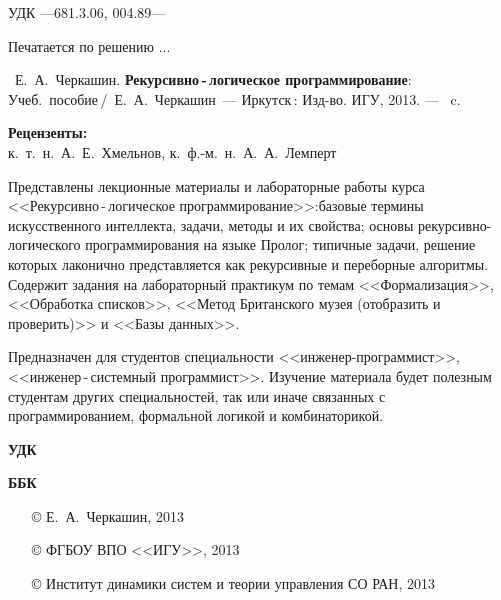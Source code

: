 \documentclass[12pt, openany, twoside]{book} %
\newenvironment{mygroup}{}{}
\begin{document}
\newpage
\begin{mygroup}
\thispagestyle{empty}
\noindent УДК ---681.3.06, 004.89---

\begin{raggedright}
\hspace{6em}Печатается по решению ...
\end{raggedright}

\vfill%
{}

{~Е.~А.~Черкашин.} {\bf Рекурсивно\,-\,логическое программирование}: Учеб.~пособие\,/~Е.~А.~Черкашин~---
Иркутск\,: Изд-во. ИГУ, 2013. --- \pageref{pg:lastpage}~c.
\vspace{1ex}
\begin{center}
\textbf{Рецензенты:} \\
к.~т.~н.~А.~Е.~Хмельнов, к.~ф.-м.~н.~А.~А.~Лемперт
\end{center}
\vspace{1ex}
Представлены лекционные материалы и лабораторные работы курса <<Рекурсивно\,-\,логическое программирование>>:базовые термины искусственного интеллекта, задачи, методы и их свойства; основы рекурсивно-логического программирования на языке Пролог; типичные задачи, решение которых лаконично представляется как рекурсивные и переборные алгоритмы. Содержит задания на лабораторный практикум по темам <<Формализация>>, <<Обработка списков>>, <<Метод Британского музея (отобразить и проверить)>> и <<Базы данных>>.

    Предназначен для студентов специальности
<<инженер-програм\-мист>>, <<инженер\,-\,системный програм\-мист>>.
Изучение материала будет полезным студентам других специальностей, так или иначе связанных с программированием, формальной логикой и комбинаторикой.

\textbf{УДК}

\textbf{ББК}

\vfill\vfill

\vfill
\hbox{}\hfill
\begin{minipage}{0.6\linewidth}
\begin{itemize}
\setlength{\itemsep}{0pt}
\setlength{\parsep}{0pt}
\item[\copyright{}] Е.~А.~Черкашин, 2013
\item[\copyright{}] ФГБОУ ВПО <<ИГУ>>, 2013
\item[\copyright{}] Институт динамики систем и теории управления СО РАН, 2013
\end{itemize}
\end{minipage}
\end{mygroup}
\tableofcontents
\clearpage
\end{document}
